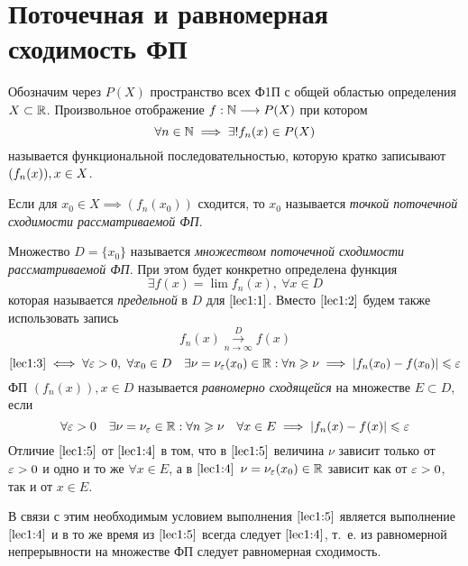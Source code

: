 \documentclass[../../main.tex]{subfiles}
\begin{document}
\section{Поточечная и равномерная сходимость ФП}
Обозначим через $P(X)$ пространство всех Ф1П 
с общей областью определения $X \subset \mathbb{R}$.
Произвольное отображение $f: \mathbb{N} \longrightarrow P(X)$ при котором 
\begin{equation}
\label{lec1:1}
\forall n \in \mathbb{N} \implies \exists! f_n(x) \in P(X)
\end{equation}
называется функциональной последовательностью, 
которую кратко записывают $(f_n(x)),\\ x\in X$.

Если для $x_0 \in X \implies (f_n(x_0))$ сходится, то $x_0$ называется
\emph{точкой поточечной сходимости рассматриваемой ФП}.

Множество $D = \{x_0\}$ называется \emph{множеством поточечной сходимости
рассматриваемой ФП}.
При этом будет конкретно определена функция 
\begin{equation}
\label{lec1:2}
\exists f(x) = \lim f_n(x),\ \forall x \in D
\end{equation}
которая называется \emph{предельной} в $D$ для $\eqref{lec1:1}$.
Вместо $\eqref{lec1:2}$ будем также использовать запись 
\begin{equation}
\label{lec1:3}
f_n(x) \overset{D}{\underset{n \to \infty}\longrightarrow} f(x)
\end{equation}
\begin{equation}
\label{lec1:4}
\eqref{lec1:3} \iff \forall \varepsilon > 0,\ \forall x_0 \in D \quad 
\exists \nu = \nu_\varepsilon(x_0) \in \mathbb{R} : \forall n \geqslant \nu \implies
|f_n(x_0) - f(x_0)| \leqslant \varepsilon
\end{equation}
ФП $(f_n(x)), x \in D$ называется \emph{равномерно сходящейся} 
на множестве $E \subset D$, если 
\begin{equation}
\label{lec1:5}
\forall \varepsilon > 0 \quad
\exists \nu = \nu_\varepsilon \in \mathbb{R} : 
\forall n \geqslant \nu \quad
\forall x \in E \implies 
|f_n(x) - f(x)| \leqslant \varepsilon
\end{equation}
Отличие $\eqref{lec1:5}$ от $\eqref{lec1:4}$ в том, что  в $\eqref{lec1:5}$
величина $\nu$ зависит только от $\varepsilon > 0$ и одно и то же $\forall x \in E$,
а в $\eqref{lec1:4}$ $\nu = \nu_\varepsilon(x_0) \in \mathbb{R}$ зависит как от $\varepsilon > 0$,
так и от $x \in E$.

В связи с этим необходимым условием выполнения $\eqref{lec1:5}$ 
является выполнение $\eqref{lec1:4}$ и в то же время из $\eqref{lec1:5}$
всегда следует $\eqref{lec1:4}$, т.~е. из равномерной непрерывности на 
множестве ФП следует равномерная сходимость.
\end{document}
